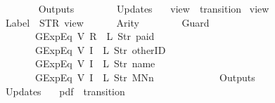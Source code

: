 \begin{isabellebody}
\ \ \ \ \ \ {\isacharbrackright}{\isacharcomma}\isanewline
\ \ \ \ \ \ Outputs\ {\isacharequal}\ {\isacharbrackleft}{\isacharbrackright}{\isacharcomma}\isanewline
\ \ \ \ \ \ Updates\ {\isacharequal}\ {\isacharbrackleft}{\isacharbrackright}\isanewline
{\isasymrparr}{\isachardoublequoteclose}\isanewline
\isanewline
{}\isamarkupfalse%
\ {\isachardoublequoteopen}view{}{\isachardoublequoteclose}\ {\isacharcolon}{\isacharcolon}\ {\isachardoublequoteopen}transition{\isachardoublequoteclose}\ \isanewline
{\isachardoublequoteopen}view{}\ {\isasymequiv}\ {\isasymlparr}\isanewline
\ \ \ \ \ \ Label\ {\isacharequal}\ STR\ {\isacharprime}{\isacharprime}view{\isacharprime}{\isacharprime}{\isacharcomma}\isanewline
\ \ \ \ \ \ Arity\ {\isacharequal}\ {}{\isacharcomma}\isanewline
\ \ \ \ \ \ Guard\ {\isacharequal}\ {\isacharbrackleft}\isanewline
\ \ \ \ \ \ \ \ \ \ \ \ GExp{\isachardot}Eq\ {\isacharparenleft}V\ {\isacharparenleft}R\ {}{\isacharparenright}{\isacharparenright}\ {\isacharparenleft}L\ {\isacharparenleft}Str\ {\isacharprime}{\isacharprime}paid{\isacharprime}{\isacharprime}{\isacharparenright}{\isacharparenright}{\isacharcomma}\isanewline
\ \ \ \ \ \ \ \ \ \ \ \ GExp{\isachardot}Eq\ {\isacharparenleft}V\ {\isacharparenleft}I\ {}{\isacharparenright}{\isacharparenright}\ {\isacharparenleft}L\ {\isacharparenleft}Str\ {\isacharprime}{\isacharprime}otherID{\isacharprime}{\isacharprime}{\isacharparenright}{\isacharparenright}{\isacharcomma}\isanewline
\ \ \ \ \ \ \ \ \ \ \ \ GExp{\isachardot}Eq\ {\isacharparenleft}V\ {\isacharparenleft}I\ {}{\isacharparenright}{\isacharparenright}\ {\isacharparenleft}L\ {\isacharparenleft}Str\ {\isacharprime}{\isacharprime}name{\isacharprime}{\isacharprime}{\isacharparenright}{\isacharparenright}{\isacharcomma}\isanewline
\ \ \ \ \ \ \ \ \ \ \ \ GExp{\isachardot}Eq\ {\isacharparenleft}V\ {\isacharparenleft}I\ {}{\isacharparenright}{\isacharparenright}\ {\isacharparenleft}L\ {\isacharparenleft}Str\ {\isacharprime}{\isacharprime}MNn{}{\isacharprime}{\isacharprime}{\isacharparenright}{\isacharparenright}\isanewline
\ \ \ \ \ \ {\isacharbrackright}{\isacharcomma}\isanewline
\ \ \ \ \ \ Outputs\ {\isacharequal}\ {\isacharbrackleft}{\isacharbrackright}{\isacharcomma}\isanewline
\ \ \ \ \ \ Updates\ {\isacharequal}\ {\isacharbrackleft}{\isacharbrackright}\isanewline
{\isasymrparr}{\isachardoublequoteclose}\isanewline
\isanewline
{}\isamarkupfalse%
\ {\isachardoublequoteopen}pdf{\isachardoublequoteclose}\ {\isacharcolon}{\isacharcolon}\ {\isachardoublequoteopen}transition{\isachardoublequoteclose}\ \isanewline

\end{isabellebody}
